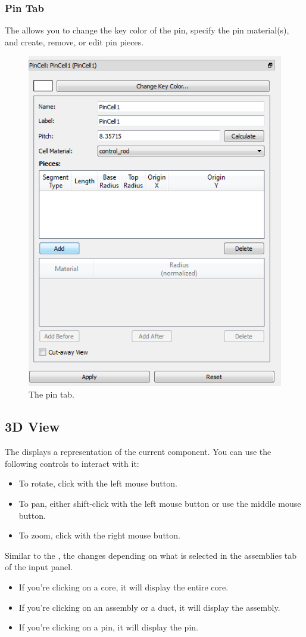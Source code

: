 \subsubsection{Pin Tab}
The  allows you to change the key color of the pin, specify the pin material(s), and create, remove, or edit pin pieces.

\begin{figure}[h]
	\begin{center}
		\includegraphics[width=0.4\linewidth]{Images/hex-11.png}
		\caption{The pin tab.}
		\label{fig:pintab}
	\end{center}
\end{figure}

\subsection{3D View}
The  displays a representation of the current component.  You can use the following controls to interact with it:

\begin{itemize}
	\item{To rotate, click with the left mouse button.}
	\item{To pan, either shift-click with the left mouse button or use the middle mouse button.}
	\item{To zoom, click with the right mouse button.}
\end{itemize}

Similar to the , the  changes depending on what is selected in the assemblies tab of the input panel.

\begin{itemize}
	\item{If you're clicking on a core, it will display the entire core.}
	\item{If you're clicking on an assembly or a duct, it will display the assembly.}
	\item{If you're clicking on a pin, it will display the pin.}
\end{itemize}